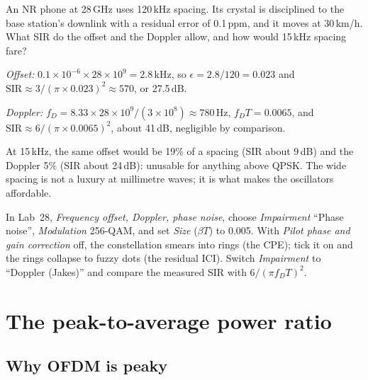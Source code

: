 \begin{worked}
An NR phone at 28\,GHz uses 120\,kHz spacing. Its crystal is disciplined to the base station's downlink with a
residual error of 0.1\,ppm, and it moves at 30\,km/h. What SIR do the offset and the Doppler allow, and how
would 15\,kHz spacing fare?

\emph{Offset:} $0.1\times10^{-6}\times28\times10^9=2.8$\,kHz, so $\epsilon=2.8/120=0.023$ and
$\text{SIR}\approx3/(\pi\times0.023)^2\approx570$, or 27.5\,dB.

\emph{Doppler:} $f_D=8.33\times28\times10^9/(3\times10^8)\approx780$\,Hz, $f_DT=0.0065$, and
$\text{SIR}\approx6/(\pi\times0.0065)^2$, about 41\,dB, negligible by comparison.

At 15\,kHz, the same offset would be 19\% of a spacing (SIR about 9\,dB) and the Doppler 5\% (SIR about 24\,dB):
unusable for anything above QPSK. The wide spacing is not a luxury at millimetre waves; it is what makes
the oscillators affordable.
\end{worked}

\begin{tryit}
In Lab~28, \emph{Frequency offset, Doppler, phase noise}, choose \emph{Impairment} ``Phase noise'',
\emph{Modulation} 256-QAM, and set \emph{Size} ($\beta T$) to 0.005. With \emph{Pilot phase and gain
correction} off, the constellation smears into rings (the CPE); tick it on and the rings collapse to
fuzzy dots (the residual ICI). Switch \emph{Impairment} to ``Doppler (Jakes)'' and compare the
measured SIR with $6/(\pi f_DT)^2$.
\end{tryit}

\section{The peak-to-average power ratio}
\label{sec:ch17:papr}

\subsection{Why OFDM is peaky}



